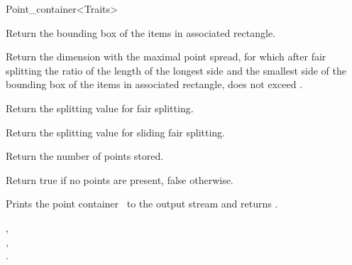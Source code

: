 \begin{ccRefClass}{Point_container<Traits>}
\begin{ccAdvanced}
{Return the bounding box of the items in associated rectangle.}

{Return the dimension with the maximal point spread, for which after fair splitting
the ratio of the length of the longest side and the smallest side of the bounding box of
the items in associated rectangle,
does not exceed .}

{Return the splitting value for fair splitting.}

{Return the splitting value for sliding fair splitting.}

{
Return the number of points stored.
}

{
Return true if no points are present, false otherwise.
}





{Prints the point container \ccVar\ to the output stream  and returns .}


\ccSeeAlso

,\\
,\\
.

\end{ccAdvanced}
\end{ccRefClass}


